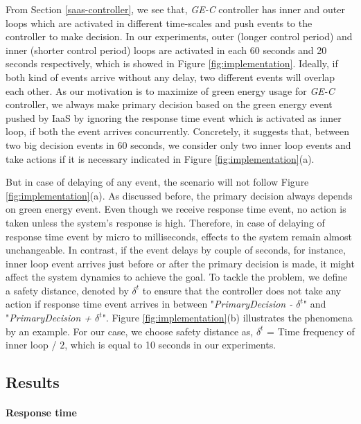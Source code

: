 From Section \ref{saas-controller}, we see that, \emph{GE-C} controller has inner and outer loops which are activated in different time-scales and push events to the controller to make decision. In our experiments, outer (longer control period) and inner (shorter control period) loops are activated in each 60 seconds and 20 seconds respectively, which is showed in Figure \ref{fig:implementation}. Ideally, if both kind of events arrive without any delay, two different events will overlap each other. As our motivation is to maximize of green energy usage for \emph{GE-C} controller, we always make primary decision based on the green energy event pushed by IaaS by ignoring the response time event which is activated as inner loop, if both the event arrives concurrently. Concretely, it suggests that, between two big decision events in 60 seconds, we consider only two inner loop events and take actions if it is necessary indicated in Figure \ref{fig:implementation}(a).

But in case of delaying of any event, the scenario will not follow Figure \ref{fig:implementation}(a). As discussed before, the primary decision always depends on green energy event. Even though we receive response time event, no action is taken unless the system's response is high. Therefore, in case of delaying of response time event by micro to milliseconds, effects to the system remain almost unchangeable. In contrast, if the event delays by couple of seconds, for instance, inner loop event arrives just before or after the primary decision is made, it might affect the system dynamics to achieve the goal. To tackle the problem, we define a safety distance, denoted by $\delta^t$ to ensure that the controller does not take any action if response time event arrives in between "\textit{PrimaryDecision - $\delta^t$}" and "\textit{PrimaryDecision + $\delta^t$}". Figure \ref{fig:implementation}(b) illustrates the phenomena by an example. For our case, we choose safety distance as, $\delta^t$ = Time frequency of inner loop / $2$, which is equal to 10 seconds in our experiments.



\subsection{Results}

\paragraph*{\textbf{Response time}}

